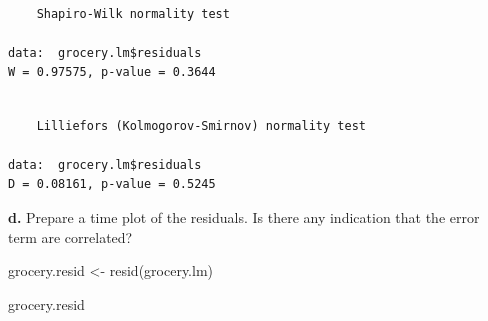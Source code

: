 \documentclass[
  letterpaper,
  DIV=11,
  numbers=noendperiod]{scrartcl}
\newenvironment{Shaded}{\begin{snugshade}}{\end{snugshade}}
\newcommand{\FunctionTok}[1]{\textcolor[rgb]{0.28,0.35,0.67}{#1}}
\newcommand{\NormalTok}[1]{\textcolor[rgb]{0.00,0.23,0.31}{#1}}
\newcommand{\OtherTok}[1]{\textcolor[rgb]{0.00,0.23,0.31}{#1}}
\newcommand{\SpecialCharTok}[1]{\textcolor[rgb]{0.37,0.37,0.37}{#1}}
\begin{document}
\begin{Shaded}
\end{Shaded}

\begin{verbatim}

    Shapiro-Wilk normality test

data:  grocery.lm$residuals
W = 0.97575, p-value = 0.3644
\end{verbatim}

\begin{Shaded}
\end{Shaded}

\begin{verbatim}

    Lilliefors (Kolmogorov-Smirnov) normality test

data:  grocery.lm$residuals
D = 0.08161, p-value = 0.5245
\end{verbatim}

\textbf{d.} Prepare a time plot of the residuals. Is there any
indication that the error term are correlated?

\begin{Shaded}
\begin{Highlighting}[]
\NormalTok{grocery.resid }\OtherTok{\textless{}{-}} \FunctionTok{resid}\NormalTok{(grocery.lm)}
\end{Highlighting}
\end{Shaded}

\begin{Shaded}
\begin{Highlighting}[]
\NormalTok{grocery.resid}
\end{Highlighting}
\end{Shaded}
\end{document}

